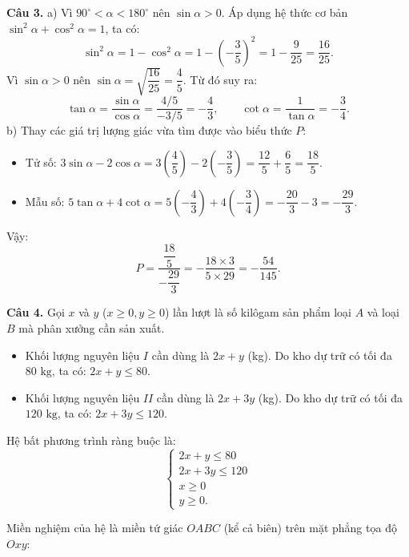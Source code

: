 \documentclass[12pt,a4paper]{article}
\begin{document}
\textbf{Câu 3.}
a) Vì $90^\circ < \alpha < 180^\circ$ nên $\sin \alpha > 0$.
Áp dụng hệ thức cơ bản $\sin^2 \alpha + \cos^2 \alpha = 1$, ta có:
\[
\sin^2 \alpha = 1 - \cos^2 \alpha = 1 - \left(-\dfrac{3}{5}\right)^2 = 1 - \dfrac{9}{25} = \dfrac{16}{25}.
\]
Vì $\sin \alpha > 0$ nên $\sin \alpha = \sqrt{\dfrac{16}{25}} = \dfrac{4}{5}$.
Từ đó suy ra:
\[
\tan \alpha = \dfrac{\sin \alpha}{\cos \alpha} = \dfrac{4/5}{-3/5} = -\dfrac{4}{3}, \qquad \cot \alpha = \dfrac{1}{\tan \alpha} = -\dfrac{3}{4}.
\]
b) Thay các giá trị lượng giác vừa tìm được vào biểu thức $P$:
\begin{itemize}[leftmargin=0.5cm, itemsep=1pt, topsep=1pt]
    \item Tử số: $3\sin \alpha - 2\cos \alpha = 3\left(\dfrac{4}{5}\right) - 2\left(-\dfrac{3}{5}\right) = \dfrac{12}{5} + \dfrac{6}{5} = \dfrac{18}{5}$.
    \item Mẫu số: $5\tan \alpha + 4\cot \alpha = 5\left(-\dfrac{4}{3}\right) + 4\left(-\dfrac{3}{4}\right) = -\dfrac{20}{3} - 3 = -\dfrac{29}{3}$.
\end{itemize}
Vậy:
\[
P = \dfrac{\dfrac{18}{5}}{-\dfrac{29}{3}} = -\dfrac{18 \times 3}{5 \times 29} = -\dfrac{54}{145}.
\]

\textbf{Câu 4.}
Gọi $x$ và $y$ ($x \ge 0, y \ge 0$) lần lượt là số kilôgam sản phẩm loại $A$ và loại $B$ mà phân xưởng cần sản xuất.
\begin{itemize}[leftmargin=0.5cm, itemsep=1pt, topsep=1pt]
    \item Khối lượng nguyên liệu $I$ cần dùng là $2x + y$ (kg). Do kho dự trữ có tối đa $80\text{ kg}$, ta có: $2x + y \le 80$.
    \item Khối lượng nguyên liệu $II$ cần dùng là $2x + 3y$ (kg). Do kho dự trữ có tối đa $120\text{ kg}$, ta có: $2x + 3y \le 120$.
\end{itemize}
Hệ bất phương trình ràng buộc là:
\[
\begin{cases}
2x + y \le 80 \\
2x + 3y \le 120 \\
x \ge 0 \\
y \ge 0.
\end{cases}
\]

Miền nghiệm của hệ là miền tứ giác $OABC$ (kể cả biên) trên mặt phẳng tọa độ $Oxy$:
\end{document}

